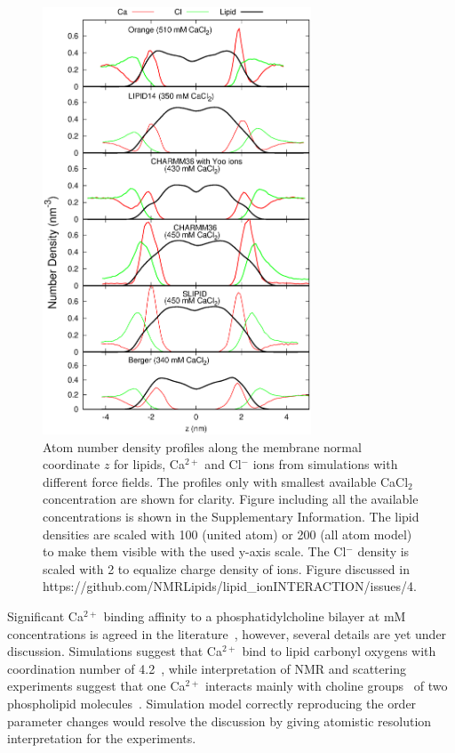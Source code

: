 \documentclass[pre,aps,floatfix,authordate1-4,twocolumn]{revtex4-1}
\begin{document}
\begin{figure}[]
  \centering
  \includegraphics[width=8cm]{../Fig/CAdensitiesCLEAR.eps}
  \caption{\label{CAdensitiesCLEAR}
    Atom number density profiles along the membrane normal coordinate $z$ for lipids, Ca$^{2+}$ and Cl$^-$ ions from simulations 
    with different force fields.
    The profiles only with smallest available CaCl$_2$ concentration are shown for clarity.
    Figure including all the available concentrations is shown in the Supplementary Information.
    The lipid densities are scaled with 100 (united atom) or 200 (all atom model) to make them visible with the used y-axis scale.
    The Cl$^-$ density is scaled with 2 to equalize charge density of ions.
    Figure discussed in https://github.com/NMRLipids/lipid\_ionINTERACTION/issues/4.
  }
\end{figure}

Significant Ca$^{2+}$ binding affinity to a phosphatidylcholine bilayer at mM concentrations  
is agreed in the literature~\cite{akutsu81,altenbach84,cevc90,tocanne90}, however, several
details are yet under discussion. Simulations suggest that Ca$^{2+}$ bind to lipid carbonyl
oxygens with coordination number of 4.2~\cite{bockmann04}, while interpretation of NMR and 
scattering experiments suggest that one Ca$^{2+}$ interacts mainly with choline 
groups~\cite{hauser76,hauser78,herbette84} of two phospholipid molecules~\cite{altenbach84}. 
Simulation model correctly reproducing the order parameter changes would resolve the discussion
by giving atomistic resolution interpretation for the experiments.
\end{document}

